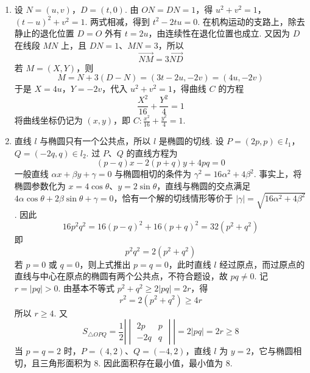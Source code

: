 \begin{solution}
\begin{enumerate}
\item 设 \(N=(u,v)\)，\(D=(t,0)\). 由 \(ON=DN=1\)，得
\(u^2+v^2=1\)，\((t-u)^2+v^2=1\).
两式相减，得到 \(t^2-2tu=0\). 在机构运动的支路上，除去静止的退化位置 \(D=O\) 外有 \(t=2u\)，由连续性在退化位置也成立. 又因为 \(D\) 在线段 \(MN\) 上，且 \(DN=1\)、\(MN=3\)，所以
\[
\overrightarrow{NM}=3\overrightarrow{ND}
\]
若 \(M=(X,Y)\)，则
\[
M=N+3(D-N)=(3t-2u,-2v)=(4u,-2v)
\]
于是 \(X=4u\)，\(Y=-2v\)，代入 \(u^2+v^2=1\)，得曲线 \(C\) 的方程
\[
\frac{X^2}{16}+\frac{Y^2}{4}=1
\]
将曲线坐标仍记为 \((x,y)\)，即
\(C\colon \frac{x^2}{16}+\frac{y^2}{4}=1\).

\item 直线 \(l\) 与椭圆只有一个公共点，所以 \(l\) 是椭圆的切线. 设
\(P=(2p,p)\in l_1\)，\(Q=(-2q,q)\in l_2\).
过 \(P\)、\(Q\) 的直线方程为
\[
(p-q)x-2(p+q)y+4pq=0
\]
一般直线 \(\alpha x+\beta y+\gamma=0\) 与椭圆相切的条件为
\(\gamma^2=16\alpha^2+4\beta^2\). 事实上，将椭圆参数化为 \(x=4\cos\theta\)、\(y=2\sin\theta\)，直线与椭圆的交点满足
\(4\alpha\cos\theta+2\beta\sin\theta+\gamma=0\)，恰有一个解的切线情形等价于 \(\lvert\gamma\rvert=\sqrt{16\alpha^2+4\beta^2}\).
因此
\[
16p^2q^2=16(p-q)^2+16(p+q)^2=32(p^2+q^2)
\]
即
\[
p^2q^2=2(p^2+q^2)
\]
若 \(p=0\) 或 \(q=0\)，则上式推出 \(p=q=0\)，此时直线 \(l\) 经过原点，而过原点的直线与中心在原点的椭圆有两个公共点，不符合题设，故 \(pq\neq0\). 记 \(r=\lvert pq\rvert>0\). 由基本不等式
\(p^2+q^2\geqslant2\lvert pq\rvert=2r\)，得
\[
r^2=2(p^2+q^2)\geqslant4r
\]
所以 \(r\geqslant4\). 又
\[
S_{\triangle OPQ}=\frac{1}{2}\left|\begin{vmatrix}2p&p\\-2q&q\end{vmatrix}\right|=2\lvert pq\rvert=2r\geqslant8
\]
当 \(p=q=2\) 时，\(P=(4,2)\)、\(Q=(-4,2)\)，直线 \(l\) 为 \(y=2\)，它与椭圆相切，且三角形面积为 \(8\). 因此面积存在最小值，最小值为 \(8\).
\end{enumerate}
\end{solution}
